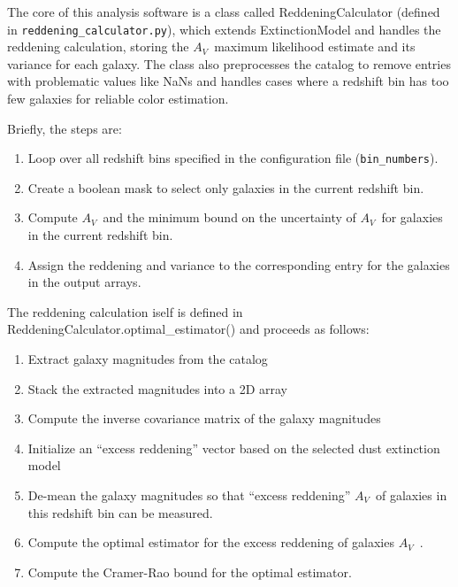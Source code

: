 \documentclass[11pt, oneside]{article}   	%
\newcommand{\av}{$A_V$~}
\begin{document}
The core of this analysis software is a class called ReddeningCalculator (defined in \texttt{reddening\_calculator.py}), which extends ExtinctionModel and handles the reddening calculation, storing the \av maximum likelihood estimate and its variance for each galaxy. The class also preprocesses the catalog to remove entries with problematic values like NaNs and handles cases where a redshift bin has too few galaxies for reliable color estimation. 

Briefly, the steps are:

\begin{enumerate}

    \item Loop over all redshift bins specified in the configuration file (\texttt{bin\_numbers}). 
    \item Create a boolean mask to select only galaxies in the current redshift bin.
    \item Compute \av and the minimum bound on the uncertainty of \av for galaxies in the current redshift bin.
    \item Assign the reddening and variance to the corresponding entry for the galaxies in the output arrays. 

\end{enumerate}

The reddening calculation iself is defined in ReddeningCalculator.optimal\_estimator() and proceeds as follows:
\begin{enumerate}
         \item Extract galaxy magnitudes from the catalog
 
         \item Stack the extracted magnitudes into a 2D array

         \item Compute the inverse covariance matrix of the galaxy magnitudes

         \item Initialize an ``excess reddening'' vector based on the selected dust extinction model

         \item De-mean the galaxy magnitudes so that ``excess reddening'' \av of galaxies in this redshift bin can be measured. 

         \item Compute the optimal estimator for the excess reddening of galaxies \av. 
         \item Compute the Cramer-Rao bound for the optimal estimator. 

\end{enumerate}
\end{document}
